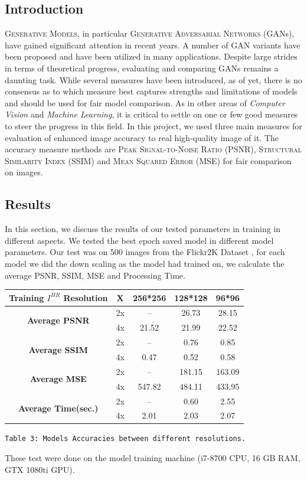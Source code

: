 \documentclass[12pt]{article}
\begin{document}
		\subsection{Introduction}
			\textsc{Generative Models}, in particular \textsc{Generative Adversarial Networks} (GANs), have gained significant attention in recent years. A number of GAN variants have been proposed and have been utilized in many applications. Despite large strides in terms of theoretical progress, evaluating and comparing GANs remains a daunting task. While several measures have been introduced, as of yet, there is no consensus as to which measure best captures strengths and limitations of models and should be used for fair model comparison. As in other areas of \textit{Computer Vision} and \textit{Machine Learning}, it is critical to settle on one or few good measures to steer the progress in this field. In this project, we used three main measures for evaluation of enhanced image accuracy to real high-quality image of it. The accuracy measure methods are \textsc{Peak Signal-to-Noise Ratio} (PSNR), \textsc{Structural Similarity Index} (SSIM) and \textsc{Mean Squared Error} (MSE) for fair comparison on images.
		\subsection{Results}
			In this section, we discuss the results of our tested parameters in training in different aspects. We tested the best epoch saved model in different model parameters. Our test was on 500 images from the Flickr2K Dataset \cite{30}, for each model we did the down scaling as the model had trained on, we calculate the average PSNR, SSIM, MSE and Processing Time.
			\begin{center}
				\vspace{0.4in}
				\begin{tabular}{c|c|c|c|c}
					\textbf{Training $I^{HR}$ Resolution} & X & \textbf{256*256} & \textbf{128*128} & \textbf{96*96} \\\hline
					\multirow{2}{*}{\textbf{Average PSNR}} & 2x & -- & 26.73 & 28.15 \\\cline{2-5} & 4x & 21.52 & 21.99 & 22.52\\\hline
					\multirow{2}{*}{\textbf{Average SSIM}} & 2x & -- & 0.76 & 0.85 \\\cline{2-5} & 4x & 0.47 & 0.52 & 0.58\\\hline
					\multirow{2}{*}{\textbf{Average MSE}} & 2x & -- & 181.15 & 163.09 \\\cline{2-5} & 4x & 547.82 & 484.11 & 433.95\\\hline
					\multirow{2}{*}{\textbf{Average Time(sec.)}} & 2x & -- & 0.60 & 2.55 \\\cline{2-5} & 4x & 2.01 & 2.03 & 2.07
				\end{tabular}
				\vspace{0.2in}
					
				\texttt{Table 3: Models Accuracies between different resolutions.}
				\vspace{0.1in}
			\end{center}
			These test were done on the model training machine (i7-8700 CPU, 16 GB RAM, GTX 1080ti GPU).
\end{document}
